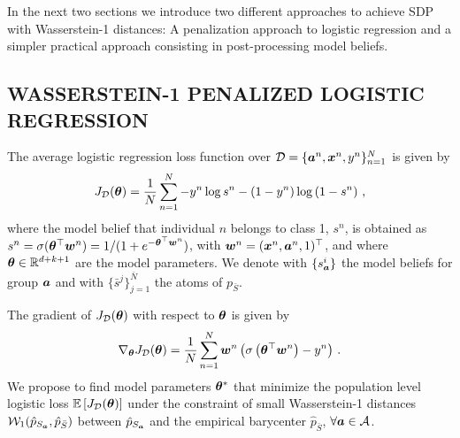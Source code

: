 \documentclass[letterpaper]{article}
\theoremstyle{definition}
\newcommand{\W}{\mathcal{W}}
\newcommand{\bs}{\bar{s}}
\newcommand{\bS}{\bar{S}}
\renewcommand{\tC}{\textrm{C}}
\newcommand{\st}{\emph{s.t.}}
\begin{document}
In the next two sections we introduce two different approaches to achieve SDP with Wasserstein-1 distances: A penalization approach to logistic regression and a simpler practical approach consisting in post-processing model beliefs. 

\subsection{WASSERSTEIN-1 PENALIZED LOGISTIC REGRESSION\label{sec:wass1penalty}}
The average logistic regression loss function over $\mathcal{D}=\{{\bm{a}}^n,{\bm{x}}^n,y^n\}_{n=1}^N$ is given by
\begin{equation*}
    J_{\mathcal{D}}({\bm{\theta}}) = \frac{1}{N}\sum_{n=1}^N -y^n \log s^n - (1-y^n)\log\left(1-s^n\right)\,,
\end{equation*}
where the model belief that individual $n$ belongs to class 1, $s^n$, is obtained as $s^n = \sigma({\bm{\theta}}^\top {\bm{w}}^n) = 1/(1+ e^{-{\bm{\theta}}^\top {\bm{w}}^n})$, with ${\bm{w}}^n = ({\bm{x}}^n,{\bm{a}}^n,1)^\top$, and where ${\bm{\theta}} \in \mathbb{R}^{d+k+1}$ are the model parameters. We denote with $\{ s_{{\bm{a}}}^i \}$ the model beliefs for group ${\bm{a}}$ and with $\{ \bar{s}^j\}_{j=1}^{\bar{N}}$ the atoms of $p_{\bS}$.

The gradient of $J_{\mathcal{D}}({\bm{\theta}})$ with respect to ${\bm{\theta}}$ is given by
\begin{equation*}
    \nabla_{\bm{\theta}} J_\mathcal{D}({\bm{\theta}})  = \frac{1}{N} \sum_{n=1}^N {\bm{w}}^n\left(\sigma\left({\bm{\theta}}^\top{\bm{w}}^n  \right) - y^n \right)\,.
\end{equation*}
We propose to find model parameters ${\bm{\theta}}^*$ that minimize the population level logistic loss $\mathbb{E}\left[ J_\mathcal{D}({\bm{\theta}})\right]$ under the constraint 
of small Wasserstein-1 distances $\W_1(\hat{p}_{S_\va}, \hat{p}_{\bS})$ between $\hat{p}_{S_{\bm{a}}}$ and the empirical barycenter $\hat{p}_{\bS}$, $\forall {\bm{a}} \in \mathcal{A}$. 

\end{document}
